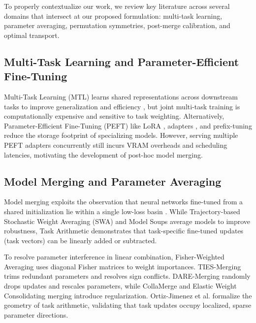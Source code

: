 \documentclass{article}
\theoremstyle{plain}
\theoremstyle{definition}
\theoremstyle{remark}
\begin{document}
To properly contextualize our work, we review key literature across several domains that intersect at our proposed formulation: multi-task learning, parameter averaging, permutation symmetries, post-merge calibration, and optimal transport.

\subsection{Multi-Task Learning and Parameter-Efficient Fine-Tuning}
Multi-Task Learning (MTL) learns shared representations across downstream tasks to improve generalization and efficiency \citep{caruana1997multitask, ruder2017overview, mangla2020charting}, but joint multi-task training is computationally expensive and sensitive to task weighting. Alternatively, Parameter-Efficient Fine-Tuning (PEFT) like LoRA \citep{hu2021lora}, adapters \citep{houlsby2019parameter}, and prefix-tuning \citep{li2021prefix} reduce the storage footprint of specializing models. However, serving multiple PEFT adapters concurrently still incurs VRAM overheads and scheduling latencies, motivating the development of post-hoc model merging.

\subsection{Model Merging and Parameter Averaging}
Model merging exploits the observation that neural networks fine-tuned from a shared initialization lie within a single low-loss basin \citep{entezari2021role, ainsworth2023git}. While Trajectory-based Stochastic Weight Averaging (SWA) \citep{izmailov2018averaging} and Model Soups \citep{wortsman2022model} average models to improve robustness, Task Arithmetic \citep{ilharco2022editing} demonstrates that task-specific fine-tuned updates (task vectors) can be linearly added or subtracted.

To resolve parameter interference in linear combination, Fisher-Weighted Averaging \citep{matena2022merging} uses diagonal Fisher matrices to weight importances. TIES-Merging \citep{yadav2023ties} trims redundant parameters and resolves sign conflicts. DARE-Merging \citep{jin2023dataless} randomly drops updates and rescales parameters, while CollaMerge \citep{yu2023collaborative} and Elastic Weight Consolidating merging \citep{daheim2023elastic} introduce regularization. Ortiz-Jimenez et al. \citep{ortiz2023geometry} formalize the geometry of task arithmetic, validating that task updates occupy localized, sparse parameter directions.
\end{document}
